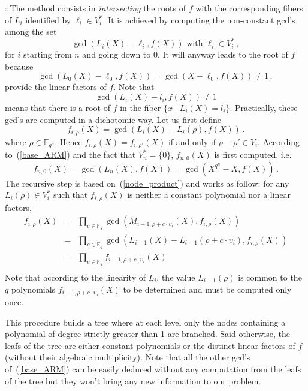 \documentclass{sig-alternate}
\newcommand{\ff}[1]{\mathbb{F}_{#1}}
\newcommand{\qq}{q}
\newcommand{\nn}{n}
\newcommand{\qn}{{\qq^\nn}}
\newcommand{\basef}{\ff{\qq}}
\newcommand{\extf}{\ff{\qn}}
\begin{document}
: The method consists in \emph{intersecting} the roots of $f$ with the corresponding fibers of $L_i$ identified by $\ell_i \in V_i^\ast$.
 It is achieved by computing the non-constant gcd's among the set
 \begin{equation}
 \label{base_ARM}
\gcd(L_i(X)-\ell_i,f(X))     \mbox{ with }  \ell_i  \in V_i^\ast\,,
\end{equation}
for $i$ starting from $n$ and going down to 0.
It will anyway leads to the root of $f$ because 
$$\gcd(L_0(X)-\ell_0,f(X))=\gcd(X-\ell_0,f(X)) \ne 1\,,$$ 
provide the linear factors of $f$. 
Note that 
$$\gcd(L_i(X)-l_i,f(X)) \ne 1$$
means that there is a root of $f$ in the fiber $\{x \mid L_i(X)=l_i \}$.
Practically, these gcd's are computed in a dichotomic way. Let us first define
 $$f_{i,\rho}(X)=\gcd(L_i(X)-L_i(\rho),f(X))\,.$$
where $\rho \in \extf$. Hence $f_{i,\rho}(X)=f_{i,\rho'}(X)$ if and only if $\rho-\rho' \in V_i$.
According to~(\ref{base_ARM}) and the fact that $V_n^\ast=\{0\}$, $f_{n,0}(X)$ is first computed, i.e.
 $$f_{n,0}(X)=\gcd(L_n(X),f(X))=\gcd(X^{q^\nn}-X,f(X))\,.$$
The recursive step is based on~(\ref{node_product}) and works as follow: for any $L_i(\rho) \in V_i^\ast$ such that $f_{i,\rho}(X)$ is neither a constant polynomial nor a linear factors,
  $$
  \begin{array}{lll}
  f_{i,\rho}(X)&=&\prod_{c \in \basef} \gcd(M_{i-1,\rho+c \cdot \upsilon_i}(X),f_{i,\rho}(X)) \\
               &=&\prod_{c \in \basef} \gcd(L_{i-1}(X)-L_{i-1}(\rho+c \cdot \upsilon_i),f_{i,\rho}(X)) \\
               &=&\prod_{c \in \basef} f_{i-1,\rho+c \cdot  \upsilon_i}(X)\\
  \end{array}              
  $$ 
 Note that according to the linearity of $L_i$, the value $L_{i-1}(\rho)$ is common to the $\qq$ polynomials $f_{i-1,\rho+c \cdot  \upsilon_i}(X)$ to be determined and must be computed only once. 
 
 This procedure builds a tree where at each level only the nodes containing a polynomial of degree strictly greater than 1 are branched. Said otherwise, the leafs of the tree are either constant polynomials or the distinct linear factors of $f$ (without their algebraic multiplicity). Note that all the other gcd's of~(\ref{base_ARM}) can be easily deduced without any computation from the leafs of the tree but they won't bring any new information to our problem.
 
\end{document}
